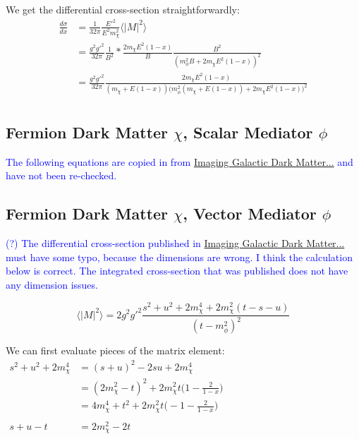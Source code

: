 \documentclass[11pt, oneside]{article}   	%
\begin{document}
We get the differential cross-section straightforwardly:
\begin{align*}
    \frac{d\sigma}{dx} &= \frac{1}{32\pi} \frac{E'^2}{E^2 m_\chi^2} \langle \left| M \right|^2 \rangle \\
    &= \frac{g^2g'^2}{32\pi} \frac{1}{B^2} * \frac{2m_\chi E^2 (1-x)}{B} \frac{B^2}{(m_\phi^2B + 2m_\chi E^2(1-x))^2} \\
    &= \frac{g^2g'^2}{32\pi} \frac{2m_\chi E^2(1-x)}{(m_\chi + E(1-x)) \Big(m_\phi^2 (m_\chi + E(1-x)) + 2m_\chi E^2(1-x) \Big)^2} \\
\end{align*}

\newpage
\subsection{\normalsize Fermion Dark Matter $\chi$, Scalar Mediator $\phi$ }

\textcolor{blue}{The following equations are copied in from \href{https://arxiv.org/pdf/1703.00451.pdf}{Imaging Galactic Dark Matter...} and have not been re-checked.}

\newpage
\subsection{\normalsize Fermion Dark Matter $\chi$, Vector Mediator $\phi$ }

\textcolor{blue}{(?) The differential cross-section published in \href{https://arxiv.org/pdf/1703.00451.pdf}{Imaging Galactic Dark Matter...} must have some typo, because the dimensions are wrong. I think the calculation below is correct. The integrated cross-section that was published does not have any dimension issues.}

\[ \langle \left| M \right|^2 \rangle  = 2 g^2 g'^2 \frac{s^2 + u^2 + 2m_\chi^4 + 2m_\chi^2 (t - s - u) }{(t-m_\phi^2)^2} \]

We can first evaluate pieces of the matrix element:
\begin{align*}
    s^2 + u^2 + 2m_\chi^4 &= (s+u)^2 - 2su + 2m_\chi^4 \hspace{8cm} \\
    &= (2m_\chi^2 - t)^2 + 2m_\chi^2 t \Big(1 - \frac{2}{1-x}\Big) \\
    &= 4m_\chi^4 + t^2 + 2m_\chi^2 t \Big(-1 - \frac{2}{1-x}\Big) \\ 
    & \\
    s+u-t &= 2m_\chi^2 - 2t
\end{align*}
\end{document}
